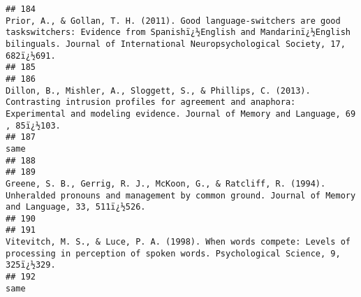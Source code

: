 \documentclass[
  english,
  man]{apa6}
\begin{document}
\begin{verbatim}
## 184                                                                                           Prior, A., & Gollan, T. H. (2011). Good language-switchers are good taskswitchers: Evidence from Spanishï¿½English and Mandarinï¿½English bilinguals. Journal of International Neuropsychological Society, 17, 682ï¿½691.
## 185                                                                                                                                                                                                                                                                                                                    
## 186                                                                                                         Dillon, B., Mishler, A., Sloggett, S., & Phillips, C. (2013). Contrasting intrusion profiles for agreement and anaphora: Experimental and modeling evidence. Journal of Memory and Language, 69 , 85ï¿½103.
## 187                                                                                                                                                                                                                                                                                                                same
## 188                                                                                                                                                                                                                                                                                                                    
## 189                                                                                                                                                Greene, S. B., Gerrig, R. J., McKoon, G., & Ratcliff, R. (1994). Unheralded pronouns and management by common ground. Journal of Memory and Language, 33, 511ï¿½526.
## 190                                                                                                                                                                                                                                                                                                                    
## 191                                                                                                                                                                Vitevitch, M. S., & Luce, P. A. (1998). When words compete: Levels of processing in perception of spoken words. Psychological Science, 9, 325ï¿½329.
## 192                                                                                                                                                                                                                                                                                                                same

\end{verbatim}
\end{document}
